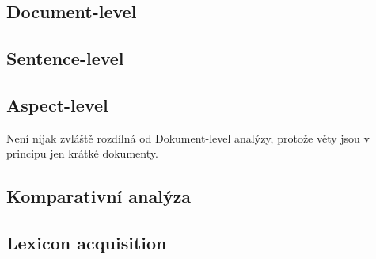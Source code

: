 \subsection{Document-level}
\blind[2]
\subsection{Sentence-level}
\blind[2]
\subsection{Aspect-level}
Není nijak zvláště rozdílná od Dokument-level analýzy, protože věty jsou v principu jen krátké dokumenty. 
\blind[2]
\subsection{Komparativní analýza}
\blind[2]
\subsection{Lexicon acquisition}
\blind[2]
		

